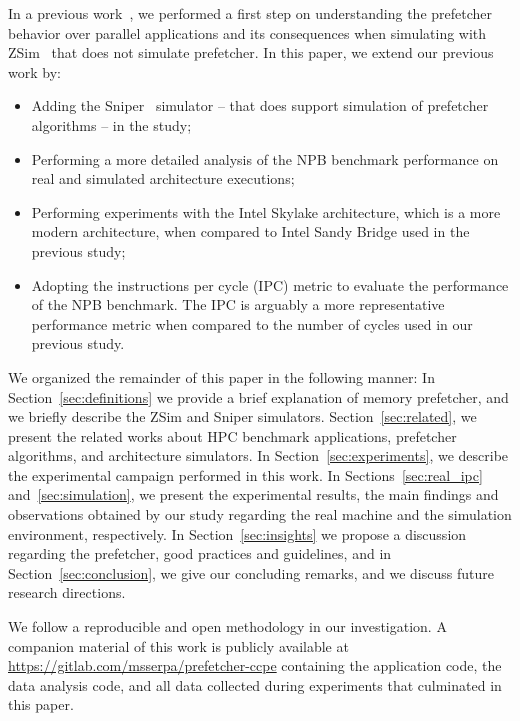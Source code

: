 \documentclass[AMA,final,STIX1COL]{WileyNJD-v2}
\def\COMPANION{{\scriptsize\url{https://gitlab.com/msserpa/prefetcher-ccpe}}\xspace}
\begin{document}
In a previous work~\cite{girelli2019impacto}, we performed a first step on understanding the prefetcher behavior over parallel applications and its consequences when simulating with ZSim~\cite{sanchez2013zsim} that does not simulate prefetcher. In this paper, we extend our previous work by:

\begin{itemize}
    \item Adding the Sniper~\cite{carlson2014aeohmcm} simulator -- that does support simulation of prefetcher algorithms -- in the study;
    \item Performing a more detailed analysis of the NPB benchmark performance on real and simulated architecture executions;
    \item Performing experiments with the Intel Skylake architecture, which is a more modern architecture, when compared to Intel Sandy Bridge used in the previous study;
    \item Adopting the instructions per cycle (IPC) metric to evaluate the performance of the NPB benchmark. The IPC is arguably a more representative performance metric when compared to the number of cycles used in our previous study.
\end{itemize}

We organized the remainder of this paper in the following manner: 
In Section~\ref{sec:definitions} we provide a brief explanation of memory prefetcher, and we briefly describe the ZSim and Sniper simulators. 
Section~\ref{sec:related}, we present the related works about HPC benchmark applications, prefetcher algorithms, and architecture simulators. 
In Section~\ref{sec:experiments}, we describe the experimental campaign performed in this work. 
In Sections~\ref{sec:real_ipc} and~\ref{sec:simulation}, we present the experimental results, the main findings and observations obtained by our study regarding the real machine and the simulation environment, respectively.
In Section~\ref{sec:insights} we propose a discussion regarding the prefetcher, good practices and guidelines, and in Section~\ref{sec:conclusion}, we give our concluding remarks, and we discuss future research directions.

We follow a reproducible and open methodology in our investigation. A companion material of this work is publicly available at \COMPANION containing the application code, the data analysis code, and all data collected during experiments that culminated in this paper.
  
\end{document}

